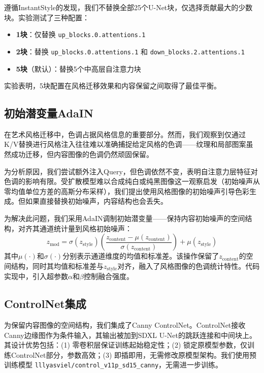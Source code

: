 \documentclass[twocolumn,a4paper,11pt]{ctexart}
\begin{document}
遵循InstantStyle的发现，我们不替换全部25个U-Net块，仅选择贡献最大的少数块。实验测试了三种配置：
\begin{itemize}
  \setlength{\itemsep}{0pt}
\item {\bfseries 1块}：仅替换 \texttt{up\_blocks.0.attentions.1}
\item {\bfseries 2块}：替换 \texttt{up\_blocks.0.attentions.1} 和 \texttt{down\_blocks.2.attentions.1}
\item {\bfseries 5块}（默认）：替换5个中高层自注意力块
\end{itemize}
实验表明，5块配置在风格迁移效果和内容保留之间取得了最佳平衡。

\subsection{初始潜变量AdaIN}

在艺术风格迁移中，色调占据风格信息的重要部分。然而，我们观察到仅通过K/V替换进行风格注入往往难以准确捕捉给定风格的色调——纹理和局部图案虽然成功迁移，但内容图像的色调仍然顽固保留。

为分析原因，我们尝试额外注入Query，但色调依然不变，表明自注意力层特征对色调的影响有限。受扩散模型难以合成纯白或纯黑图像这一观察启发（初始噪声从零均值单位方差的高斯分布采样），我们提出使用风格图像的初始噪声引导色彩生成。但如果直接替换初始噪声，内容结构也会丢失。

为解决此问题，我们采用AdaIN调制初始潜变量——保持内容初始噪声的空间结构，对齐其通道统计量到风格初始噪声：
\begin{equation}
z_{\text{mod}} = \sigma(z_{\text{style}}) \left( \frac{z_{\text{content}} - \mu(z_{\text{content}})}{\sigma(z_{\text{content}})} \right) + \mu(z_{\text{style}}) \label{eq:adain}
\end{equation}
其中$\mu(\cdot)$和$\sigma(\cdot)$分别表示通道维度的均值和标准差。该操作保留了$z_{\text{content}}$的空间结构，同时其均值和标准差与$z_{\text{style}}$对齐，融入了风格图像的色调统计特性。代码实现中，引入超参数$\alpha$和$\beta$控制融合强度。

\subsection{ControlNet集成}

为保留内容图像的空间结构，我们集成了Canny ControlNet。ControlNet接收Canny边缘图作为条件输入，其输出被加到SDXL U-Net的跳跃连接和中间块上。其设计优势包括：(1) 零卷积层保证训练起始稳定性；(2) 锁定原模型参数，仅训练ControlNet部分，参数高效；(3) 即插即用，无需修改原模型架构。我们使用预训练模型 \texttt{lllyasviel/control\_v11p\_sd15\_canny}，无需进一步训练。
\end{document}
